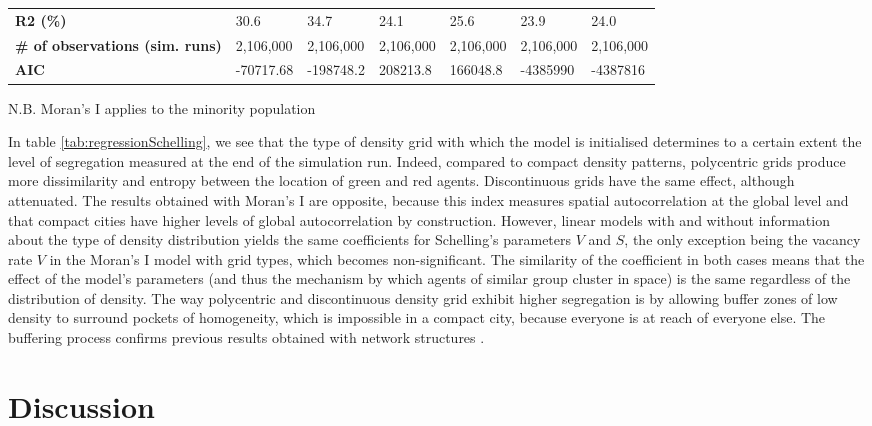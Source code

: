 \documentclass[Royal,sageh,times]{sagej}
\begin{document}
\begin{table}[]
\begin{adjustwidth}{-0.5cm}{-0.5cm}
\begin{tabular}{|m{2.5cm}|ll|ll|ll|}
\textbf{R2 (\%)}                            & 30.6       & 34.7                             & 24.1              & 25.6              & 23.9                 & 24.0                    \\ 
\textbf{\# of observations (sim. runs)}     & 2,106,000  & 2,106,000 						 & 2,106,000          & 2,106,000          & 2,106,000             & 2,106,000                \\ 
\textbf{AIC}                                & -70717.68   & -198748.2  						& 208213.8          & 166048.8          & -4385990             & -4387816                 \\ \hline
\end{tabular}
\end{adjustwidth}
N.B. Moran's I applies to the minority population
\end{table}

In table \ref{tab:regressionSchelling}, we see that the type of density grid with which the model is initialised determines to a certain extent the level of segregation measured at the end of the simulation run. Indeed, compared to compact density patterns, polycentric grids produce more dissimilarity and entropy between the location of green and red agents. Discontinuous grids have the same effect, although attenuated. The results obtained with Moran's I are opposite, because this index measures spatial autocorrelation at the global level and that compact cities have higher levels of global autocorrelation by construction. However, linear models with and without information about the type of density distribution yields the same coefficients for Schelling's parameters $V$ and $S$, the only exception being the vacancy rate $V$ in the Moran's I model with grid types, which becomes non-significant. The similarity of the coefficient in both cases means that the effect of the model's parameters (and thus the mechanism by which agents of similar group cluster in space) is the same regardless of the distribution of density. The way polycentric and discontinuous density grid exhibit higher segregation is by allowing buffer zones of low density to surround pockets of homogeneity, which is impossible in a compact city, because everyone is at reach of everyone else. The buffering process confirms previous results obtained with network structures \citep{Banos2012}.


\section{Discussion}
\end{document}
